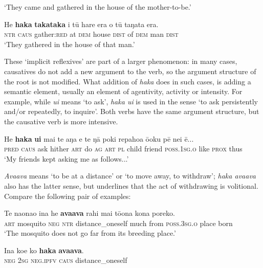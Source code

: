 \glt 
‘They came and gathered in the house of the mother-to-be.’ \textstyleExampleref{[Ley-9-55.024]}
\z

\ea\label{ex:8.243}
\gll He \textbf{haka} \textbf{takataka} {\ꞌ}i tū hare era o tū taŋata era. \\
\textsc{ntr} \textsc{caus} gather:\textsc{red} at \textsc{dem} house \textsc{dist} of \textsc{dem} man \textsc{dist} \\

\glt
‘They gathered in the house of that man.’ \textstyleExampleref{[R352.079]} 
\z

These ‘implicit reflexives’ are part of a larger phenomenon: in many cases, causatives do not add a new argument to the verb, so the argument structure of the root is not modified. What addition of \textit{haka} does in such cases, is adding a semantic element, usually an element of agentivity, activity or intensity. For example, while \textit{{\ꞌ}ui} means ‘to ask’, \textit{haka {\ꞌ}ui} is used in the sense ‘to ask persistently and/or repeatedly, to inquire’. Both verbs have the same argument structure, but the causative verb is more intensive.

\ea\label{ex:8.244}
\gll He \textbf{haka} \textbf{{\ꞌ}ui} mai te aŋa e te ŋā poki repahoa ō{\ꞌ}oku pē nei ē...\\
\textsc{pred} \textsc{caus} ask hither \textsc{art} do \textsc{ag} \textsc{art} \textsc{pl} child friend \textsc{poss.1sg.o} like \textsc{prox} thus\\

\glt
‘My friends kept asking me as follows...’ \textstyleExampleref{[R380.042]} 
\z

\textit{{\ꞌ}Ava{\ꞌ}ava} means ‘to be at a distance’ or ‘to move away, to withdraw’; \textit{haka {\ꞌ}ava{\ꞌ}ava} also has the latter sense, but underlines that the act of withdrawing is volitional. Compare the following pair of examples:

\ea\label{ex:8.245}
\gll Te naonao {\ꞌ}ina he \textbf{{\ꞌ}ava{\ꞌ}ava} rahi mai tō{\ꞌ}ona kona poreko. \\
\textsc{art} mosquito \textsc{neg} \textsc{ntr} distance\_oneself much from \textsc{poss.3sg.o} place born \\

\glt 
‘The mosquito does not go far from its breeding place.’ \textstyleExampleref{[R535.065]} 
\z

\ea\label{ex:8.246}
\gll {\ꞌ}Ina koe ko \textbf{haka} \textbf{{\ꞌ}ava{\ꞌ}ava}. \\
\textsc{neg} \textsc{2sg} \textsc{neg.ipfv} \textsc{caus} distance\_oneself \\

